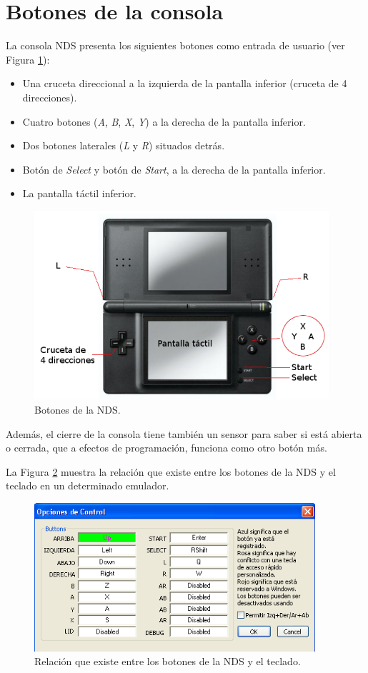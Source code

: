\section{Botones de la consola}
La consola NDS presenta los siguientes botones como entrada de usuario (ver Figura \ref{fig_c3_botones}):
\begin{itemize}
\item Una cruceta direccional a la izquierda de la pantalla inferior (cruceta de 4 direcciones).
%
\item Cuatro botones (\textit{A}, \textit{B}, \textit{X}, \textit{Y}) a la derecha de la pantalla inferior.
%
\item Dos botones laterales (\textit{L} y \textit{R}) situados detrás.
%
\item Botón de \textit{Select} y botón de \textit{Start}, a la derecha de la pantalla inferior.
%
\item La pantalla táctil inferior.
\end{itemize}

\begin{figure}[t]
\centering
\includegraphics[height=7cm]{Figuras/C3/c3_botones.png}
\caption{Botones de la NDS.}
\label{fig_c3_botones}
\end{figure}

Además, el cierre de la consola tiene también un sensor para saber si está abierta o cerrada, que a efectos de programación, funciona como otro botón más.

La Figura \ref{fig_c3_botones_teclass} muestra la relación que existe entre los botones de la NDS y el teclado en un determinado emulador.

\begin{figure}[t]
\centering
\includegraphics[height=5.5cm]{Figuras/C3/c3_botones_teclas.png}
\caption{Relación que existe entre los botones de la NDS y el teclado.}
\label{fig_c3_botones_teclass}
\end{figure}

